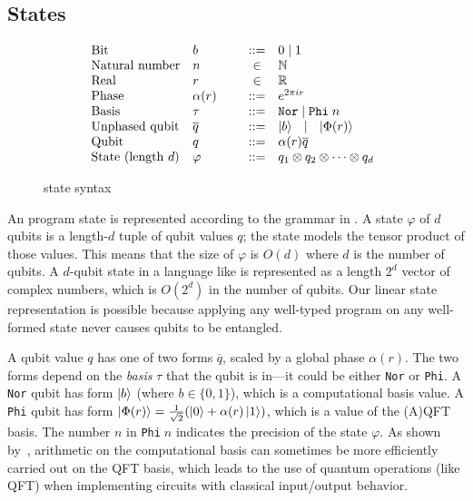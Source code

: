 \subsection{\oqasm States} \label{sec:pqasm-states}

\begin{figure}[t]
  \small
  \[\hspace*{-0.5em}
\begin{array}{l>{$} p{1.2cm} <{$} c l}
      \text{Bit} & b & ::= & 0 \mid 1 \\
      \text{Natural number} & n & \in & \mathbb{N} \\
      \text{Real} & r & \in & \mathbb{R}\\
      \text{Phase} & \alpha(r) & ::= & e^{2\pi i r} \\
      \text{Basis} & \tau & ::= & \texttt{Nor} \mid \texttt{Phi}\;n \\
      \text{Unphased qubit} & \overline{q} & ::= & \ket{b} ~~\mid~~ \qket{r} \\
      \text{Qubit} & q & ::= &\alpha(r) \overline{q}\\
      \text{State (length $d$)} & \varphi & ::= & q_1 \otimes q_2 \otimes \cdots \otimes q_d
    \end{array}
  \]
  \caption{\oqasm state syntax}
  \label{fig:vqir-state}
\end{figure}

An \oqasm program state is represented according to the grammar in
. A state $\varphi$ of $d$ qubits is 
a length-$d$ tuple of qubit values $q$; the state models the tensor
product of those values. This means that the size of $\varphi$ is
$O(d)$ where $d$ is the number of qubits. A $d$-qubit state in a
language like \sqir is represented as a length $2^d$ vector of complex
numbers, which is $O(2^d)$ in the number of qubits.  Our linear state
representation is possible because applying any well-typed \oqasm
program on any well-formed \oqasm state never causes qubits to be
entangled.

A qubit value $q$ has one of two forms $\overline{q}$, scaled by a
global phase $\alpha(r)$. The two forms depend on the \emph{basis}
$\tau$ that the qubit is in---it could be either \texttt{Nor} or \texttt{Phi}. A \texttt{Nor} qubit has form
$\left\vert{b}\right\rangle$ (where $b \in \{ 0, 1 \}$), which is a
computational basis value. 
A \texttt{Phi} qubit has form $\left\vert{\Phi(r)}\right\rangle = \frac{1}{\sqrt{2}}(\left\vert{0}\right\rangle+\alpha(r)\left\vert{1}\right\rangle)$, which is a value of the (A)QFT basis.
The number $n$ in \texttt{Phi}$\;n$ indicates the precision of the state $\varphi$.
As shown by~\citet{qft-adder}, arithmetic on the computational basis can sometimes be more efficiently carried out on the QFT basis, which leads to the use of quantum operations (like QFT) when implementing circuits with classical input/output behavior.
 
